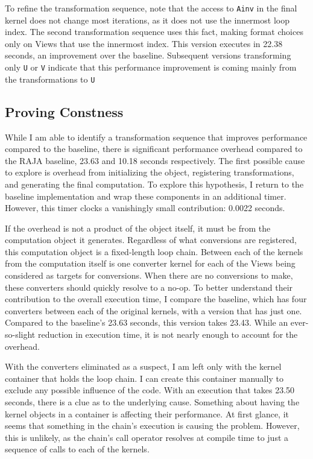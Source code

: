 To refine the transformation sequence, note that the access to \verb.Ainv. in the final kernel does not change most iterations, as it does not use the innermost loop index. 
The second transformation sequence uses this fact, making format choices only on Views that use the innermost index. 
This version executes in 22.38 seconds, an improvement over the \FormatDecisions{} baseline. 
Subsequent versions transforming only \verb.U. or \verb.V. indicate that this performance improvement is coming mainly from the transformations to \verb.U.

\subsection{Proving Constness}

While I am able to identify a transformation sequence that improves performance compared to the \FormatDecisions{} baseline, there is significant performance overhead compared to the RAJA baseline, 23.63 and 10.18 seconds respectively.
The first possible cause to explore is overhead from initializing the \FormatDecisions{} object, registering transformations, and generating the final computation. 
To explore this hypothesis, I return to the baseline implementation and wrap these components in an additional timer. 
However, this timer clocks a vanishingly small contribution: 0.0022 seconds.

If the overhead is not a product of the \FormatDecisions{} object itself, it must be from the computation object it generates.
Regardless of what conversions are registered, this computation object is a fixed-length loop chain.
Between each of the kernels from the computation itself is one converter kernel for each of the Views being considered as targets for conversions.
When there are no conversions to make, these converters should quickly resolve to a no-op.
To better understand their contribution to the overall execution time, I compare the baseline, which has four converters between each of the original kernels, with a version that has just one.
Compared to the baseline's 23.63 seconds, this version takes 23.43.
While an ever-so-slight reduction in execution time, it is not nearly enough to account for the overhead.

With the converters eliminated as a suspect, I am left only with the kernel container that holds the loop chain.
I can create this container manually to exclude any possible influence of the \FormatDecisions{} code.
With an execution that takes 23.50 seconds, there is a clue as to the underlying cause.
Something about having the kernel objects in a container is affecting their performance.
At first glance, it seems that something in the chain's execution is causing the problem.
However, this is unlikely, as the chain's call operator resolves at compile time to just a sequence of calls to each of the kernels.

